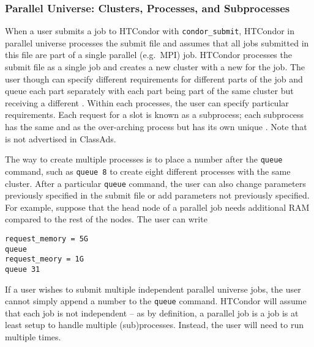 \subsubsection{\label{sec:Configure-Clusters-Processes-Subprocesses}
Parallel Universe: Clusters, Processes, and Subprocesses} 

When 
a user submits a job to HTCondor with \verb=condor_submit=, HTCondor in parallel 
universe processes the submit file and assumes that all jobs submitted in this 
file are part of a single parallel (e.g.~MPI) job. HTCondor processes the submit 
file as a single job and
creates a new cluster with a new  for the job. The user though can 
specify different requirements for different parts of the job and queue each 
part separately with each part being part of the same cluster but receiving a 
different . Within each processes, the user can specify particular
requirements.
Each request for a slot is known as a subprocess; each subprocess has the same 
 and  as the over-arching process but has its 
own unique 
. Note that  is not advertised in ClassAds.

The way to create multiple processes is to place a number after the \verb=queue= 
command, such as \verb=queue 8= to create eight different processes with the 
same cluster. After a particular \verb=queue= command, the user can also change 
parameters previously specified in the submit file or add parameters not 
previously specified. For example, suppose that the head node of a parallel job 
needs additional RAM compared to the rest of the nodes. The user can write

\begin{verbatim}
request_memory = 5G
queue
request_meory = 1G
queue 31
\end{verbatim}

If a user wishes to submit multiple independent parallel universe jobs, the 
user cannot simply append a number to the \verb=queue= command. HTCondor will 
assume that each job is not independent -- as by definition, a parallel job is a 
job is at least setup to handle multiple (sub)processes. Instead, the user will
need to run  multiple times.

